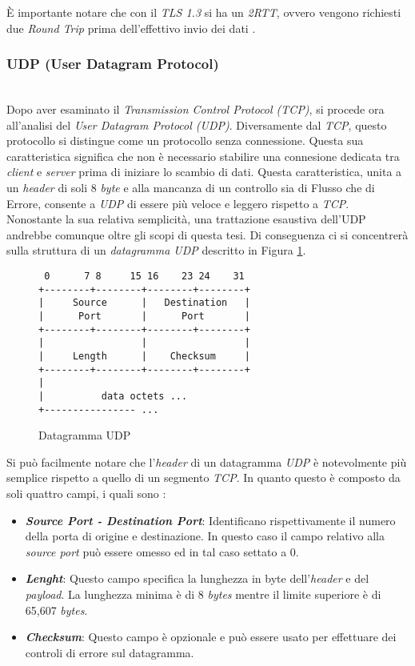 \noindent È importante notare che con il \emph{TLS 1.3} si ha un \emph{2RTT}, ovvero vengono richiesti due \emph{Round Trip} prima dell'effettivo invio dei dati \cite{site:tls}. 
\subsubsection{UDP (User Datagram Protocol)}
~\\
\indent Dopo aver esaminato il \emph{Transmission Control Protocol (TCP)},
si procede ora all'analisi del \emph{User Datagram Protocol (UDP)}. 
Diversamente dal \emph{TCP}, questo protocollo si distingue come un protocollo senza connessione. 
Questa sua caratteristica significa che non è necessario stabilire una connesione dedicata tra \emph{client} e \emph{server} prima di iniziare lo scambio di dati. 
Questa caratteristica, unita a un \emph{header} di soli 8 \emph{byte} e alla mancanza di un controllo sia di Flusso che di Errore, consente a \emph{UDP} di essere più veloce e leggero rispetto a \emph{TCP}.
\\
Nonostante la sua relativa semplicità, una trattazione esaustiva dell'UDP andrebbe comunque oltre gli scopi di questa tesi. 
Di conseguenza ci si concentrerà sulla struttura di un \emph{datagramma {UDP}} descritto in Figura \ref{udp-datagram}.
\\
\begin{figure}[!h]
    \centering
    \begin{BVerbatim}
 0      7 8     15 16    23 24    31
+--------+--------+--------+--------+
|     Source      |   Destination   |
|      Port       |      Port       |
+--------+--------+--------+--------+
|                 |                 |
|     Length      |    Checksum     |
+--------+--------+--------+--------+
|
|          data octets ...
+---------------- ...
        \end{BVerbatim}
    \caption{Datagramma UDP}
    \label{udp-datagram}
\end{figure}

\noindent Si può facilmente notare che l'\emph{header} di un datagramma \emph{UDP} è notevolmente più semplice rispetto a quello di un segmento \emph{TCP}.
In quanto questo è composto da soli quattro campi, i quali sono :  
\begin{itemize}
    \item \textit{\textbf{Source Port - Destination Port}}: Identificano rispettivamente il numero della porta di origine e destinazione. In questo caso il campo relativo alla \emph{source port} può essere omesso ed in tal caso settato a 0.
    \item \textit{\textbf{Lenght}}: Questo campo specifica la lunghezza in byte dell'\emph{header} e del \emph{payload}. La lunghezza minima è di 8 \emph{bytes} mentre il limite superiore è di 65,607 \emph{bytes}.
    \item \textit{\textbf{Checksum}}: Questo campo è opzionale e può essere usato per effettuare dei controli di errore sul datagramma.
\end{itemize}

